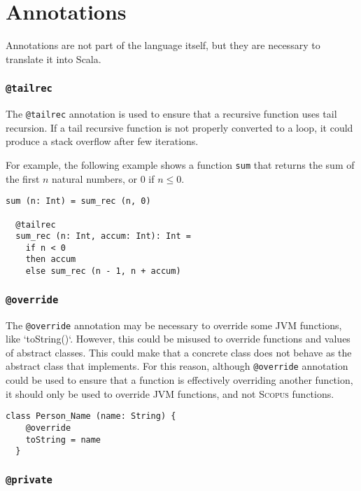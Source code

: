 \documentclass[12pt,a4paper]{book}
\makeatletter
\newcommand{\srccode}[1]{\texttt{{#1}}}
\newcommand{\annotation}[1]{{\color{brown}\srccode{#1}}\xspace}
\newcommand{\stailrec}{\annotation{@tailrec}}
\newcommand{\soverride}{\annotation{@override}}
\newcommand{\sprivate}{\annotation{@private}}
\newcommand{\Scopus}{\textsc{Scopus}\xspace}
\makeatother
\begin{document}
    \section{Annotations}

    Annotations are not part of the language itself, but they are necessary to translate it into Scala.

    \subsubsection{\stailrec}

    The \stailrec annotation is used to ensure that a recursive function uses tail recursion.
    If a tail recursive function is not properly converted to a loop, it could produce a stack overflow after few iterations.

    For example, the following example shows a function \srccode{sum} that returns the sum of the first $n$ natural numbers, or 0 if $n \leq 0$.

    \begin{lstlisting}[label={lst:exampleTailrec}]
  sum (n: Int) = sum_rec (n, 0)

  @tailrec
  sum_rec (n: Int, accum: Int): Int =
    if n < 0
    then accum
    else sum_rec (n - 1, n + accum)

    \end{lstlisting}

    \subsubsection{\soverride}

    The \soverride annotation may be necessary to override some JVM functions, like `toString()`.
    However, this could be misused to override functions and values of abstract classes.
    This could make that a concrete class does not behave as the abstract class that implements.
    For this reason, although \soverride annotation could be used to ensure that a function is effectively overriding another function, it should only be used to override JVM functions, and not \Scopus functions.

    \begin{lstlisting}[label={lst:exampleOverride}]
  class Person_Name (name: String) {
    @override
    toString = name
  }
    \end{lstlisting}

    \subsubsection{\sprivate}
\end{document}
